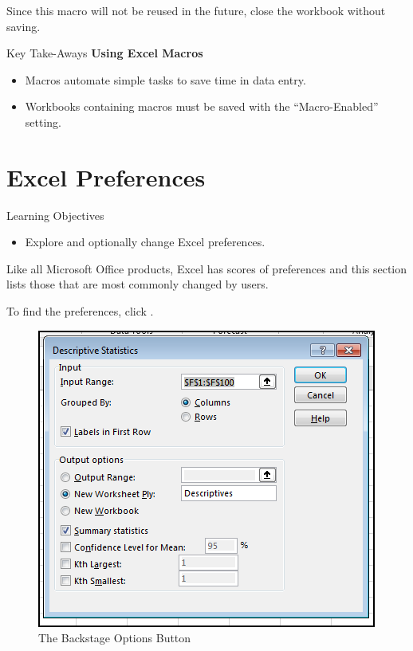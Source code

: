 Since this macro will not be reused in the future, close the workbook without saving.

\begin{center}
	\begin{tkwbox}{Key Take-Aways}
		\textbf{Using Excel Macros}
		\\
		\begin{itemize}
			\setlength{\itemsep}{0pt}
			\setlength{\parskip}{0pt}
			\setlength{\parsep}{0pt}
			
			\item Macros automate simple tasks to save time in data entry.
			\item Workbooks containing macros must be saved with the ``Macro-Enabled'' setting.
			
		\end{itemize}
	\end{tkwbox}
\end{center}

\section{Excel Preferences}

\begin{center}
	\begin{objbox}{Learning Objectives}
		\begin{itemize}
			\setlength{\itemsep}{0pt}
			\setlength{\parskip}{0pt}
			\setlength{\parsep}{0pt}
			
			\item Explore and optionally change Excel preferences.
			
		\end{itemize}
	\end{objbox}
\end{center}

Like all Microsoft Office products, Excel has scores of preferences and this section lists those that are most commonly changed by users.

To find the preferences, click .

\begin{figure}[H]
	\centering
	\includegraphics[width=\maxwidth{.95\linewidth}]{gfx/ch09_fig60}
	\caption{The Backstage Options Button}
	\label{09:fig60}
\end{figure}
 
